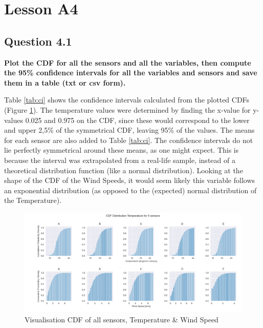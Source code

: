 \documentclass{report}
\begin{document}
	
	\section{Lesson A4}
	
	\subsection{Question 4.1}
	\textbf{Plot the CDF for all the sensors and all the variables, then compute the 95\% confidence intervals for all the variables and sensors and save them in a table (txt or csv form).}
	
	Table \ref{tab:ci} shows the confidence intervals calculated from the plotted CDFs (Figure \ref{fig:a4cdf}). The temperature values were determined by finding the x-value for y-values 0.025 and 0.975 on the CDF, since these would correspond to the lower and upper 2,5\% of the symmetrical CDF, leaving 95\% of the values. The means for each sensor are also added to Table \ref{tab:ci}. The confidence intervals do not lie perfectly symmetrical around these means, as one might expect. This is because the interval was extrapolated from a real-life sample, instead of a theoretical distribution function (like a normal distribution). Looking at the shape of the CDF of the Wind Speeds, it would seem likely this variable follows an exponential distribution (as opposed to the (expected) normal distribution of the Temperature).
	
	\begin{figure}[H]
		\includegraphics[width=\linewidth]{GEO1001_hw01_images/GEO1001_hw01_A4_CDF.png}
		\caption{Visualisation CDF of all sensors, Temperature \& Wind Speed}
		\label{fig:a4cdf}
	\end{figure}
\end{document}
